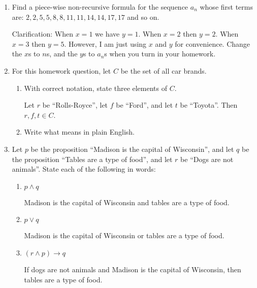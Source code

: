 \documentclass{article}
\begin{document}
\begin{enumerate}

\item 
Find a piece-wise non-recursive formula for the sequence $a_n$ whose first terms are: $2,2,5,5,8,8,11,11,14,14,17,17$ and so on.

Clarification: When $x=1$ we have $y=1$. When $x=2$ then $y=2$. When $x=3$ then $y=5$. However, I am just using $x$ and $y$ for convenience. Change the $x$s to $n$s, and the $y$s to $a_n$s when you turn in your homework.

\item 
For this homework question, let $C$ be the set of all car brands.
\begin{enumerate}
\item With correct notation, state three elements of $C$.

\indent Let $r$ be ``Rolls-Royce'', let $f$ be ``Ford'', and let $t$ be ``Toyota''. Then $r, f, t \in C$.

\item Write what  means in plain English.
\end{enumerate}

\item 
Let $p$ be the proposition ``Madison is the capital of Wisconsin'', and let $q$ be the proposition ``Tables are a type of food'', and let $r$ be ``Dogs are not animals''. State each of the following in words:
\begin{enumerate}
\item $p \wedge q$

Madison is the capital of Wisconsin and tables are a type of food.

\item $p \vee q$

Madison is the capital of Wisconsin or tables are a type of food.

\item $(r \wedge p) \rightarrow q$

If dogs are not animals and Madison is the capital of Wisconsin, then tables are a type of food.


\end{enumerate}
\end{enumerate}
\end{document}
